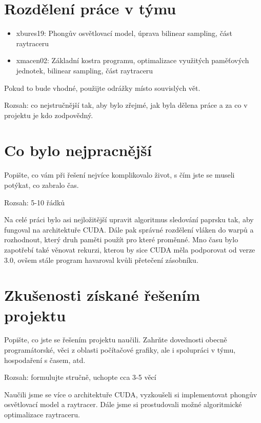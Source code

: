 \documentclass[12pt,a4paper,titlepage,final]{report}
\begin{document}
\section{Rozdělení práce v týmu}

\begin{itemize}
\item xbures19: Phongův osvětlovací model, úprava bilinear sampling, část raytraceru 
\item xmacen02: Základní kostra programu, optimalizace využitých paměťových jednotek, bilinear sampling, část raytraceru 
\end{itemize}
Pokud to bude vhodné, použijte odrážky místo souvislých vět.

Rozsah: co nejstručnější tak, aby bylo zřejmé, jak byla dělena práce a za co v
projektu je kdo zodpovědný.

\section{Co bylo nejpracnější}

Popište, co vám při řešení nejvíce komplikovalo život, s čím jste se museli
potýkat, co zabralo čas.

Rozsah: 5-10 řádků

Na celé práci bylo asi nejložitější upravit algoritmus sledování paprsku tak,
aby fungoval na architektuře CUDA. Dále pak správné rozdělení vláken do warpů 
a rozhodnout, který druh paměti použít pro které proměnné. Mno času bylo zapotřebí  
také věnovat rekurzi, kterou by sice CUDA měla podporovat od verze 3.0,  
ovšem stále program havaroval kvůli přetečení zásobníku.

\section{Zkušenosti získané řešením projektu}

Popište, co jste se řešením projektu naučili. Zahrňte dovednosti obecně
programátorské, věci z oblasti počítačové grafiky, ale i spolupráci v týmu,
hospodaření s časem, atd.

Rozsah: formulujte stručně, uchopte cca 3-5 věcí

Naučili jsme se více o architektuře CUDA, vyzkoušeli si implementovat phongův osvětlovací model a
raytracer. Dále jsme si prostudovali možné algoritmické optimalizace raytraceru.
\end{document}
